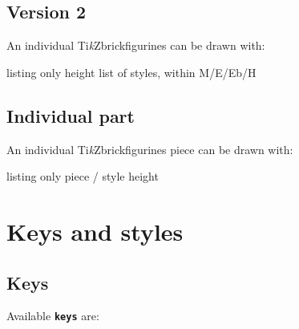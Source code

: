 \documentclass[11pt,a4paper]{ltxdoc}
\providecommand*{\tikzbrickfigurines}{Ti\emph{k}Zbrickfigurines\xspace}
\begin{document}
\subsection{Version 2}

An individual \tikzbrickfigurines can be drawn with:

\begin{DemoCode}{listing only}
%
  {height}%
  {list of styles, within M/E/Eb/H}
\end{DemoCode}

\begin{DemoCode}{}
\minitikzbrickfigurine{1.5in}{*}%
\minitikzbrickfigurine{1.5in}{*}%
\end{DemoCode}

\subsection{Individual part}

An individual \tikzbrickfigurines piece can be drawn with:

\begin{DemoCode}{listing only}
%
  {piece / style}%
  {height}
\end{DemoCode}

\begin{DemoCode}{}
%
%
%
%
\end{DemoCode}

\section{Keys and styles}

\subsection{Keys}

Available \texttt{\textbf{keys}} are:
\end{document}
